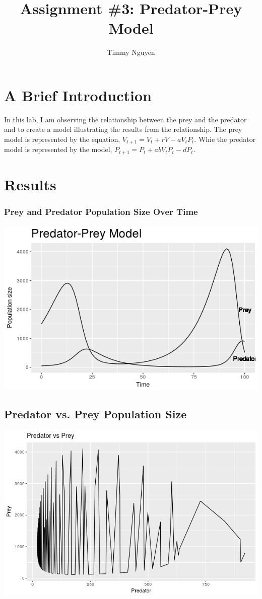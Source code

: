 \documentclass [12pt] {article}
\title{\vspace{-2cm}Assignment \#3: Predator-Prey Model}
\author{Timmy Nguyen}
\begin{document}
\maketitle
\section{A Brief Introduction}
In this lab, I am observing the relationship between the prey and the predator and to create a model illustrating the results from the relationship. The prey model is represented by the equation, $V_{t+1} = V_t + rV - aV_tP_t$. Whie the predator model is represented by the model, $P_{t+1} = P_t + abV_tP_t - dP_t$.

\section{Results}

\subsubsection{Prey and Predator Population Size Over Time}
\includegraphics[scale=0.9]{Rplot.png} \\
\newpage

\subsection{Predator vs. Prey Population Size}
\includegraphics[scale=0.9]{Rplot02.png}
\end{document}
